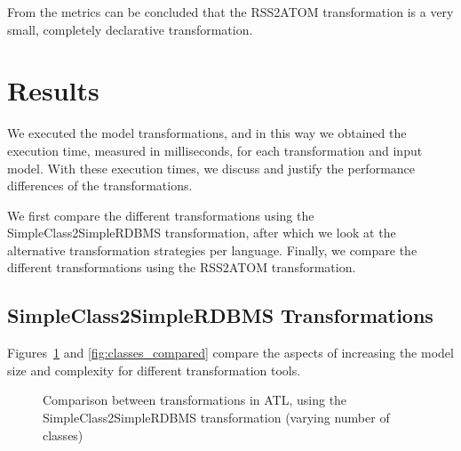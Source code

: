 \documentclass[12pt]{elsarticle}
\begin{document}
From the metrics can be concluded that the RSS2ATOM transformation is a very
small, completely declarative transformation.


\section{Results}\label{sec:results}

We executed the model transformations, and in this way we obtained the execution
time, measured in milliseconds, for each transformation and input model. With
these execution times, we discuss and justify the performance
differences of the transformations.

We first compare the different transformations using the
SimpleClass2SimpleRDBMS transformation, after which we look at the alternative
transformation strategies per language. Finally, we compare the different
transformations using the RSS2ATOM transformation.

\subsection{SimpleClass2SimpleRDBMS Transformations}

Figures~\ref{fig:attributes_compared} and \ref{fig:classes_compared}
compare the aspects of increasing the model size and complexity for different
transformation tools.\\

\begin{figure}[thb]
\centering
{}
\caption{Comparison between transformations in ATL, using the
SimpleClass2SimpleRDBMS transformation (varying number of
classes)\label{fig:attributes_compared}}
\end{figure}
\end{document}
